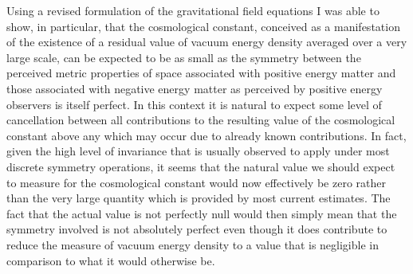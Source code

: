\documentclass[notitlepage,12pt]{report}
\begin{document}
Using a revised formulation of the gravitational field equations I was able to show, in particular, that the cosmological constant, conceived as a manifestation of the existence of a residual value of vacuum energy density averaged over a very large scale, can be expected to be as small as the symmetry between the perceived metric properties of space associated with positive energy matter and those associated with negative energy matter as perceived by positive energy observers is itself perfect. In this context it is natural to expect some level of cancellation between all contributions to the resulting value of the cosmological constant above any which may occur due to already known contributions. In fact, given the high level of invariance that is usually observed to apply under most discrete symmetry operations, it seems that the natural value we should expect to measure for the cosmological constant would now effectively be zero rather than the very large quantity which is provided by most current estimates. The fact that the actual value is not perfectly null would then simply mean that the symmetry involved is not absolutely perfect even though it does contribute to reduce the measure of vacuum energy density to a value that is negligible in comparison to what it would otherwise be.
\end{document}
